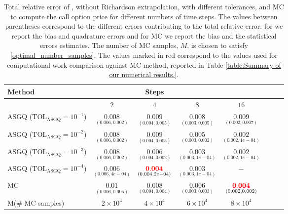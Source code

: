 \begin{table}[h!]
	\centering
	\begin{tabular}{l*{6}{c}r}
	\toprule[1.5pt]
	Method & & Steps  & &     \\
	\hline	
        & $2$ & $4$ & $8$ & $16$  \\
		\hline

		ASGQ ($\text{TOL}_{\text{ASGQ}}=10^{-1}$)  &  $\underset{(0.006,0.002)}{\mathbf{0.008}}$ & $\underset{(0.004,0.005)}{\mathbf{0.009}}$& $\underset{(0.003,0.005)}{\mathbf{ 0.008}}$ & $\underset{(0.002,0.007)}{\mathbf{ 0.009}}$   \\

		ASGQ ($\text{TOL}_{\text{ASGQ}}=10^{-2}$)  &  $\underset{(0.006,0.002)}{\mathbf{0.008}}$ & $\underset{(0.004,0.005)}{\mathbf{0.009}}$& $\underset{(0.003,0.002)}{\mathbf{ 0.005}}$ & $\underset{(0.002,1e-04)}{\mathbf{ 0.002}}$  \\
		ASGQ ($\text{TOL}_{\text{ASGQ}}=10^{-3}$)  &  $\underset{(0.006,0.002)}{\mathbf{0.008}}$& $\underset{(0.004,0.002)}{\mathbf{0.006}}$& $\underset{(0.003,1e-04)}{\mathbf{0.003}}$  & $\underset{(0.002,1e-04)}{\mathbf{ 0.002}}$  \\
		ASGQ ($\text{TOL}_{\text{ASGQ}}=10^{-4}$)  &  $\underset{(0.006,4e-04)}{\mathbf{0.006}}$ & $\underset{(0.004,2e-04)}{\mathbf{{\color{red}0.004}}}$& $\underset{(0.003,1e-04)}{\mathbf{0.003}}$ & $\mathbf{ -}$ \\

		
		\hline
		MC    & $\underset{(0.006,0.005)}{\mathbf{0.01}}$  & $\underset{(0.004,0.004)}{ \mathbf{0.008}}$  & $\underset{(0.003,0.003)}{\mathbf{0.006}}$ & $\underset{(0.002,0.002)}{\mathbf{{\color{red}0.004}}}$  \\	
		M(\# MC samples) 	& $2 \times 10^4$  & $4 \times 10^4$  & $6 \times 10^4$ & $8 \times 10^4$  \\
		\bottomrule[1.25pt]
	\end{tabular}
	\caption{Total relative error of , without Richardson extrapolation, with different tolerances, and MC to compute the call option price  for different numbers of time steps. The values between parentheses correspond to the different errors contributing to the total relative error: for  we report the bias and quadrature errors and for MC we report the bias and the statistical errors estimates. The number of MC samples, $M$, is chosen to satisfy \eqref{optimal_number_samples}. The values marked in red correspond to the values used for computational work comparison against MC method, reported in Table \ref{table:Summary of our numerical results.}.}
	\label{Total error of MISC and MC to compute Call option price of the different tolerances for different number of time steps. Case set 4, without Richardson extrapolation. The numbers between parentheses are the corresponding absolute errors.}
\end{table}

